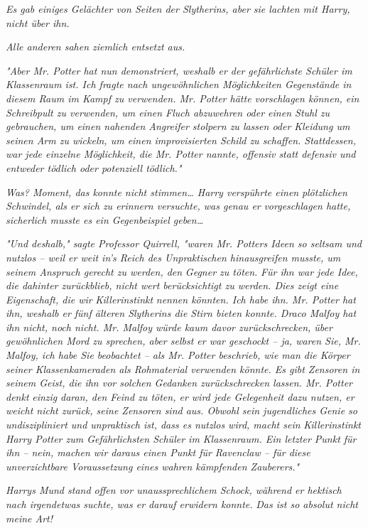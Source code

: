 {\emph{Es gab einiges Gelächter von Seiten der Slytherins, aber sie lachten mit Harry, nicht über ihn.}

\emph{Alle anderen sahen ziemlich entsetzt aus.}

\emph{"Aber Mr. Potter hat nun demonstriert, weshalb er der gefährlichste Schüler im Klassenraum ist. Ich fragte nach ungewöhnlichen Möglichkeiten Gegenstände in diesem Raum im Kampf zu verwenden. Mr. Potter hätte vorschlagen können, ein Schreibpult zu verwenden, um einen Fluch abzuwehren oder einen Stuhl zu gebrauchen, um einen nahenden Angreifer stolpern zu lassen oder Kleidung um seinen Arm zu wickeln, um einen improvisierten Schild zu schaffen. Stattdessen, war jede einzelne Möglichkeit, die Mr. Potter nannte, offensiv statt defensiv und entweder tödlich oder potenziell tödlich."}

\emph{Was? Moment, das konnte nicht stimmen… Harry verspührte einen} \emph{plötzlichen Schwindel, als er sich zu erinnern versuchte, was genau er} \emph{vorgeschlagen hatte, sicherlich musste es ein Gegenbeispiel geben…}

\emph{"Und deshalb," sagte Professor Quirrell, "waren Mr. Potters Ideen so seltsam und nutzlos -- weil er weit in's Reich des Unpraktischen hinausgreifen musste, um seinem Anspruch gerecht zu werden, den} \emph{\emph{Gegner zu töten.}} \emph{Für ihn war jede Idee, die dahinter zurückblieb, nicht wert berücksichtigt zu werden. Dies zeigt eine Eigenschaft, die wir} \emph{\emph{Killerinstinkt}} \emph{nennen könnten. Ich habe ihn. Mr. Potter hat ihn, weshalb er fünf älteren Slytherins die Stirn bieten konnte. Draco Malfoy hat ihn nicht, noch nicht. Mr. Malfoy würde kaum davor zurückschrecken, über gewöhnlichen Mord zu sprechen, aber selbst er war geschockt -- ja, waren Sie, Mr. Malfoy, ich habe Sie beobachtet -- als Mr. Potter beschrieb, wie man die Körper seiner Klassenkameraden als Rohmaterial verwenden könnte. Es gibt Zensoren in seinem Geist, die ihn vor solchen Gedanken zurückschrecken lassen. Mr. Potter denkt} \emph{\emph{einzig}} \emph{daran, den Feind zu töten, er wird jede Gelegenheit dazu nutzen, er weicht nicht zurück, seine Zensoren sind aus. Obwohl sein jugendliches Genie so undiszipliniert und unpraktisch ist, dass es nutzlos wird, macht sein} \emph{\emph{Killerinstinkt}} \emph{Harry Potter zum Gefährlichsten Schüler im Klassenraum. Ein letzter Punkt für ihn -- nein, machen wir daraus einen Punkt für Ravenclaw -- für diese unverzichtbare Voraussetzung eines wahren kämpfenden Zauberers."}

\emph{Harrys Mund stand offen vor unaussprechlichem Schock, während er hektisch nach irgendetwas suchte, was er darauf erwidern konnte.} \emph{\emph{Das ist so absolut nicht meine Art!}}

}
